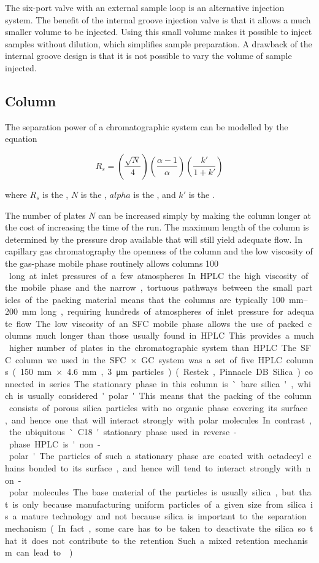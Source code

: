 The six-port valve with an external sample loop is an alternative injection
system. The benefit of the internal groove injection valve is that it allows a
much smaller volume to be injected. Using this small volume makes it possible to
inject samples without dilution, which simplifies sample preparation. A drawback
of the internal groove design is that it is not possible to vary the volume of
sample injected.


\subsection{Column}

The separation power of a chromatographic system can be modelled by the equation 

\[
 R_s = \left(\frac{\sqrt{N}}{4}\right)  \left(\frac{\alpha-1}{\alpha}\right)  \left(\frac{k'}{1+k'}\right)
\]

where \(R_s\) is the , \(N\) is the , \(alpha\) is the , and \(k'\) is the
.
 
The number of plates \(N\) can be increased simply by making the column longer
at the cost of increasing the time of the run. The maximum length of the column
is determined by the pressure drop available that will still yield adequate
flow. In capillary gas chromatography the openness of the column and the low
viscosity of the gas-phase mobile phase routinely allows columns \SI{100}{\metre
} long at inlet pressures of a few atmospheres. In HPLC the high viscosity of
the mobile phase and the narrow, tortuous pathways between the small particles
of the packing material means that the columns are typically
\SIrange{100}{200}{\milli\metre} long, requiring hundreds of atmospheres of
inlet pressure for adequate flow.

The low viscosity of an SFC mobile phase allows the use of packed columns much
longer than those usually found in HPLC. This provides a much higher number of
plates in the chromatographic system than HPLC. The SFC column we used in the
SFC×GC system was a set of five HPLC columns (\SI{150}{\milli\metre} ×
\SI{4.6}{\milli\metre}, \SI{3}{\micro\metre} particles) (Restek, Pinnacle DB
Silica) connected in series.

The stationary phase in this column is `bare silica', which is usually
considered 'polar'. This means that the packing of the column consists of porous
silica particles with no organic phase covering its surface, and hence one that
will interact strongly with polar molecules. In contrast, the ubiquitous `C18'
stationary phase used in reverse-phase HPLC is 'non-polar'. The particles of
such a stationary phase are coated with octadecyl chains bonded to its surface,
and hence will tend to interact strongly with non-polar molecules. The base
material of the particles is usually silica, but that is only because
manufacturing uniform particles of a given size from silica is a mature
technology and not because silica is important to the separation mechanism. (In
fact, some care has to be taken to deactivate the silica so that it does not
contribute to the retention. Such a mixed retention mechanism can lead to
.)

